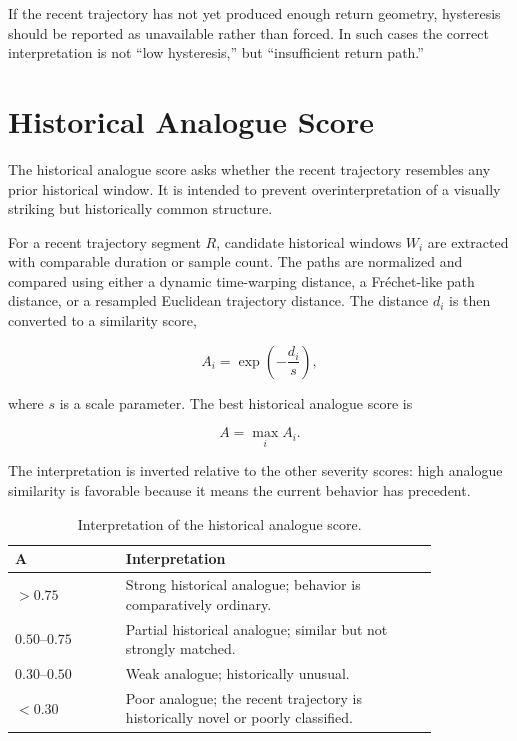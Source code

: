 \documentclass[11pt]{article}
\begin{document}
If the recent trajectory has not yet produced enough return geometry, hysteresis should be reported as unavailable rather than forced. In such cases the correct interpretation is not ``low hysteresis,'' but ``insufficient return path.''

\section{Historical Analogue Score}

The historical analogue score asks whether the recent trajectory resembles any prior historical window. It is intended to prevent overinterpretation of a visually striking but historically common structure.

For a recent trajectory segment \(R\), candidate historical windows \(W_i\) are extracted with comparable duration or sample count. The paths are normalized and compared using either a dynamic time-warping distance, a Fréchet-like path distance, or a resampled Euclidean trajectory distance. The distance \(d_i\) is then converted to a similarity score,

\begin{equation}
A_i = \exp\left(-\frac{d_i}{s}\right),
\end{equation}

where \(s\) is a scale parameter. The best historical analogue score is

\begin{equation}
A = \max_i A_i.
\end{equation}

The interpretation is inverted relative to the other severity scores: high analogue similarity is favorable because it means the current behavior has precedent.

\begin{table}[H]
\centering
\caption{Interpretation of the historical analogue score.}
\begin{tabular}{>{\raggedleft\arraybackslash}p{0.22\linewidth} p{0.62\linewidth}}
\toprule
\(\boldsymbol{A}\) & Interpretation \\
\midrule
\(>0.75\) & Strong historical analogue; behavior is comparatively ordinary. \\
\(0.50\)--\(0.75\) & Partial historical analogue; similar but not strongly matched. \\
\(0.30\)--\(0.50\) & Weak analogue; historically unusual. \\
\(<0.30\) & Poor analogue; the recent trajectory is historically novel or poorly classified. \\
\bottomrule
\end{tabular}
\end{table}
\end{document}
